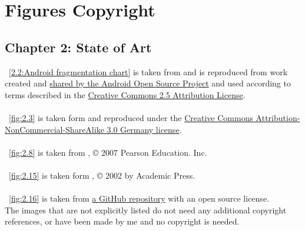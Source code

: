 %
%
\chapter{Figures Copyright}
%
\label{cap:figurescopyright}
%
%
\section*{Chapter 2: State of Art}
\bigskip
\figurename~\ref{2.2:Android fragmentation chart} is taken from \cite{devandroiddash} and is reproduced from work created and \href{http://code.google.com/policies.html}{shared by the Android Open Source Project} and used according to terms described in the \href{http://creativecommons.org/licenses/by/2.5/}{Creative Commons 2.5 Attribution License}.\\\\
\figurename~\ref{fig:2.3} is taken form \cite{vogel2016android} and reproduced under the \href{http://creativecommons.org/licenses/by-nc-sa/3.0/de/deed.en}{Creative Commons Attribution-NonCommercial-ShareAlike 3.0 Germany license}.\\\\
\figurename~\ref{fig:2.8} is taken from \cite{tanenbaum2010distributed}, © 2007 Pearson Education. Inc.\\\\
\figurename~\ref{fig:2.15} is taken form \cite{calvert2011tcp}, © 2002 by Academic Press.\\\\
\figurename~\ref{fig:2.16} is taken from \href{https://github.com/harry1357931/Remote\_Method\_Invocation-RMI}{a GitHub repository} with an open source license.\\

%
\bigskip
The images that are not explicitly listed do not need any additional copyright references, or have been made by me and no copyright is needed.
 
